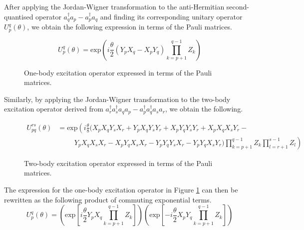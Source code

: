After applying the Jordan-Wigner transformation to the anti-Hermitian second-quantised operator $a_q^\dagger a_p - a_p^\dagger a_q$ and finding its corresponding unitary operator $U^q_p(\theta)$, we obtain the following expression in terms of the Pauli matrices.

\begin{figure}[H]
    \centering
    \begin{equation*}
        U^q_p (\theta) =
        \text{exp} \left( i
        \frac{\theta}{2} (Y_p X_q - X_p Y_q) \prod_{k=p+1}^{q-1} Z_k \right)
    \end{equation*}
    \caption{One-body excitation operator expressed in terms of the Pauli matrices.}
    \label{one-body-excitation-operator}
\end{figure}

Similarly, by applying the Jordan-Wigner transformation to the two-body excitation operator derived from $a_r^\dagger a_s^\dagger a_q a_p - a_p^\dagger a_q^\dagger a_s a_r$, we obtain the following.

\begin{figure}[H]
    \centering
    \begin{align*}
        U^{rs}_{pq} (\theta) &= \text{exp} \left( i \frac{\theta}{8} (
        X_p X_q Y_s X_r +
        Y_p X_q Y_s Y_r +
        X_p Y_q Y_s Y_r +
        X_p X_q X_s Y_r - \right. \\
        &\left. \hspace{1cm} 
        Y_p X_q X_s X_r -
        X_p Y_q X_s X_r -
        Y_p Y_q Y_s X_r -
        Y_p Y_q X_s Y_r )
        \prod_{k=p+1}^{q-1} Z_k
        \prod_{l=r+1}^{s-1} Z_l
        \right)
    \end{align*}
    \caption{Two-body excitation operator expressed in terms of the Pauli matrices.}
\end{figure}

The expression for the one-body excitation operator in Figure \ref{one-body-excitation-operator} can then be rewritten as the following product of commuting exponential terms.
\vspace{10pt}
\begin{equation*}
    U^q_p (\theta) =
    \left( \text{exp} \left[
    i \frac{\theta}{2} Y_p X_q \prod_{k=p+1}^{q-1} Z_k \right] \right)
    \left( \text{exp} \left[ -
    i \frac{\theta}{2} X_p Y_q \prod_{k=p+1}^{q-1} Z_k \right] \right)
\end{equation*}
\vspace{-16pt}

